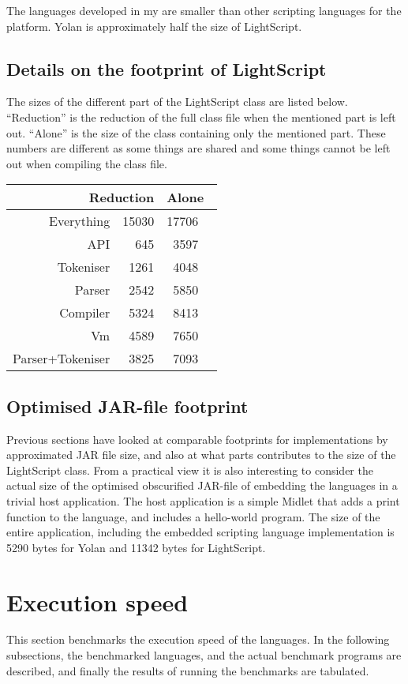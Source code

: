 \documentclass[11pt]{report}
\begin{document}
The languages developed in my are smaller than other scripting languages for the platform. 
Yolan is approximately half the size of LightScript. 

\subsection{Details on the footprint of LightScript}
The sizes of the different part of the LightScript class are listed below.
``Reduction'' is the reduction of the full class file when the mentioned part is left out. ``Alone'' is the size of the class containing only the mentioned part. These numbers are different as some things are shared and some things cannot be left out when compiling the class file.

\begin{center} \begin{tabular}{|r|r|rl|} \hline
\multicolumn{2}{|r|}{Reduction} & \multicolumn{2}{|l|}{Alone}\\ \hline
Everything & 15030 & 17706 & \\ \hline
API & 645  & 3597  & \\ \hline
Tokeniser & 1261 & 4048 & \\ \hline
Parser & 2542 & 5850 & \\ \hline
Compiler & 5324 & 8413 & \\ \hline
Vm & 4589 & 7650 & \\ \hline
Parser+Tokeniser & 3825 & 7093 & \\ \hline
\end{tabular} \end{center}

\subsection{Optimised JAR-file footprint}
Previous sections have looked at comparable footprints for implementations by approximated JAR file size, and also at what parts contributes to the size of the LightScript class.
From a practical view it is also interesting to consider the actual size of the optimised obscurified JAR-file of embedding the languages in a trivial host application.
The host application is a simple Midlet that adds a print function to the language, and includes a hello-world program.
The size of the entire application, including the embedded scripting language implementation is 5290 bytes for Yolan and 11342 bytes for LightScript.

\section{Execution speed}
This section benchmarks the execution speed of the languages. 
In the following subsections, the benchmarked languages, and the actual benchmark programs are described, and finally the results of running the benchmarks are tabulated. 
\end{document}
